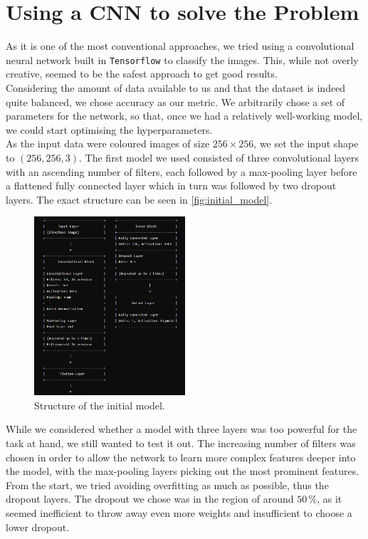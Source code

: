 \chapter{Using a CNN to solve the Problem}
\label{ch:solution}

As it is one of the most conventional approaches, we tried using a convolutional neural network built in \texttt{Tensorflow} \cite{tensorflow} to classify the images.
This, while not overly creative, seemed to be the safest approach to get good results. \\

Considering the amount of data available to us and that the dataset is indeed quite balanced, we chose accuracy as our metric.
We arbitrarily chose a set of parameters for the network, so that, once we had a relatively well-working model,
we could start optimising the hyperparameters. \\

As the input data were coloured images of size $256 \times 256$, we set the input shape to $(256, 256, 3)$.
The first model we used consisted of three convolutional layers with an ascending number of filters, 
each followed by a max-pooling layer before a flattened fully connected layer which in turn was followed by two dropout layers.
The exact structure can be seen in \autoref{fig:initial_model}. \\

\begin{figure}[H]
    \centering
    \includegraphics[width=0.5\textwidth]{images/initial_model.png}
    \caption{Structure of the initial model.}
    \label{fig:initial_model}
\end{figure}

While we considered whether a model with three layers was too powerful for the task at hand, we still wanted to test it out.
The increasing number of filters was chosen in order to allow the network to learn more complex features deeper into the model,
with the max-pooling layers picking out the most prominent features.
From the start, we tried avoiding overfitting as much as possible, thus the dropout layers.
The dropout we chose was in the region of around $50 \,\%$, as it seemed inefficient to throw away even more weights and insufficient to choose a lower dropout. \\

